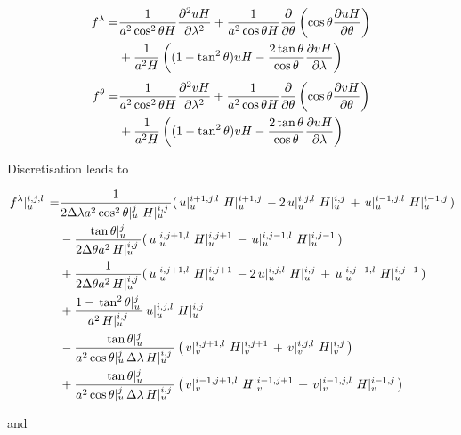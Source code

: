 \documentclass[a4paper]{article}
\begin{document}
\begin{equation}\begin{split}
  f^\lambda=&\frac1{a^2\cos^2\theta
    H}\frac{\partial^2 {uH}}{\partial {\lambda}^2}+\frac1{a^2\cos\theta H}\frac{\partial {}}{\partial {\theta}}\left(\cos\theta\frac{\partial {uH}}{\partial {\theta}}\right)\\
  &+\frac1{a^2H}\left((1-\tan^2\theta)uH-\frac{2\tan\theta}{\cos\theta}\frac{\partial {vH}}{\partial {\lambda}}\right)
\end{split}\end{equation}
\begin{equation}\begin{split}
  f^\theta=&\frac1{a^2\cos^2\theta
    H}\frac{\partial^2 {vH}}{\partial {\lambda}^2}+\frac1{a^2\cos\theta H}\frac{\partial {}}{\partial {\theta}}\left(\cos\theta\frac{\partial {vH}}{\partial {\theta}}\right)\\
  &+\frac1{a^2H}\left((1-\tan^2\theta)vH-\frac{2\tan\theta}{\cos\theta}\frac{\partial {uH}}{\partial {\lambda}}\right)
\end{split}\end{equation}

Discretisation leads to

\begin{equation}
  \begin{split}
    \,{f^\lambda}\vert_{u}^{{i},{j},{l}}\, =&
    \frac1{2\Delta\lambda a^2\,{\cos^2\theta}\vert_{u}^{{j}}\,\,{H}\vert_{u}^{{i},{j}}\,}(\,{u}\vert_{u}^{{i+1},{j},{l}}\,\,{H}\vert_{u}^{{i+1},{j}}\,-2\,{u}\vert_{u}^{{i},{j},{l}}\,\,{H}\vert_{u}^{{i},{j}}\,+\,{u}\vert_{u}^{{i-1},{j},{l}}\,\,{H}\vert_{u}^{{i-1},{j}}\,)\\
    &-\frac{\,{\tan\theta}\vert_{u}^{{j}}\,}{2\Delta\theta a^2\,{H}\vert_{u}^{{i},{j}}\,}(\,{u}\vert_{u}^{{i},{j+1},{l}}\,\,{H}\vert_{u}^{{i},{j+1}}\,-\,{u}\vert_{u}^{{i},{j-1},{l}}\,\,{H}\vert_{u}^{{i},{j-1}}\,)\\
    &+\frac1{2\Delta\theta a^2\,{H}\vert_{u}^{{i},{j}}\,}(\,{u}\vert_{u}^{{i},{j+1},{l}}\,\,{H}\vert_{u}^{{i},{j+1}}\,-2\,{u}\vert_{u}^{{i},{j},{l}}\,\,{H}\vert_{u}^{{i},{j}}\,+\,{u}\vert_{u}^{{i},{j-1},{l}}\,\,{H}\vert_{u}^{{i},{j-1}}\,)\\
    &+\frac{1-\,{\tan^2\theta}\vert_{u}^{{j}}\,}{a^2\,{H}\vert_{u}^{{i},{j}}\,}\,{u}\vert_{u}^{{i},{j},{l}}\,\,{H}\vert_{u}^{{i},{j}}\,\\
    &-\frac{\,{\tan\theta}\vert_{u}^{{j}}\,}{a^2\,{\cos\theta}\vert_{u}^{{j}}\,\Delta\lambda\,{H}\vert_{u}^{{i},{j}}\,}\left(\,{v}\vert_{v}^{{i},{j+1},{l}}\,\,{H}\vert_{v}^{{i},{j+1}}\,+\,{v}\vert_{v}^{{i},{j},{l}}\,\,{H}\vert_{v}^{{i},{j}}\,\right)\\
    &+\frac{\,{\tan\theta}\vert_{u}^{{j}}\,}{a^2\,{\cos\theta}\vert_{u}^{{j}}\,\Delta\lambda\,{H}\vert_{u}^{{i},{j}}\,}\left(\,{v}\vert_{v}^{{i-1},{j+1},{l}}\,\,{H}\vert_{v}^{{i-1},{j+1}}\,+\,{v}\vert_{v}^{{i-1},{j},{l}}\,\,{H}\vert_{v}^{{i-1},{j}}\,\right)
  \end{split}
\end{equation}

and
\end{document}
